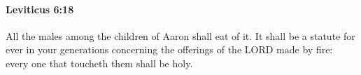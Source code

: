 
		\paragraph{Leviticus 6:18} %
			\label{LEVITICUS-6-18}

			All the males among the children of Aaron shall eat of it. It shall be a statute for ever in your generations concerning the offerings of the LORD made by fire: every one that toucheth them shall be holy.


